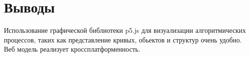 \section{Выводы}

Использование графической библиотеки p5.js для визуализации алгоритмических процессов, таких как представление кривых, обьектов и структур очень удобно. Веб модель реализует кроссплатформенность.

